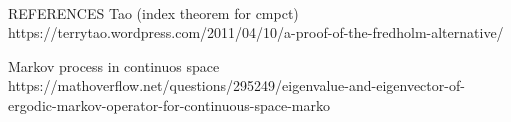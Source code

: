 \documentclass[12pt]{article}
\begin{document}
\  
  

REFERENCES
Tao (index theorem for cmpct)
https://terrytao.wordpress.com/2011/04/10/a-proof-of-the-fredholm-alternative/

Markov process in continuos space
https://mathoverflow.net/questions/295249/eigenvalue-and-eigenvector-of-ergodic-markov-operator-for-continuous-space-marko
\end{document}

